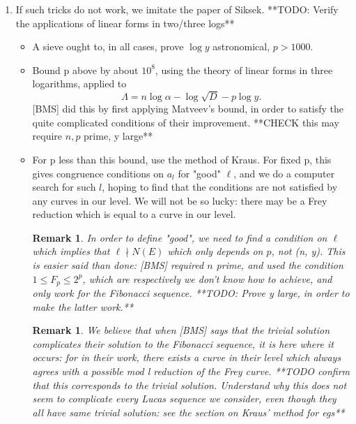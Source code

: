 \documentclass[12pt]{article}
\newtheorem{rem}[thm]{Remark}
\begin{document}
\begin{enumerate}
	\begin{rem}
	If we descend to a curve (or abelian variety) with complex multiplication, we can likely find an immediate contradiction. However, this is of little use to us, as we are often in square-free levels, i.e. semistable elliptic curves, which cannot be CM, since CM implies potentially good. To tell if your abelian varieties have complex multiplication, the only method we know of is to construct enough distinct Hecke characters of the specified conductor. This appears to work only if all abelian varieties at the level had complex multiplication. **QUESTION Can we detect CM abelian varieties?**
	\end{rem}

\item If such tricks do not work, we imitate the paper of Siksek. 
**TODO: Verify the applications of linear forms in two/three logs**
\begin{itemize}
	\item A sieve ought to, in all cases, prove $\log y$ astronomical, $p > 1000$.
	\item Bound p above by about $10^8$, using the theory of linear forms in three logarithms, applied to 
	\[\Lambda = n \log \alpha - \log \sqrt{D} - p \log{y}. \]
	[BMS] did this by first applying Matveev's bound, in order to satisfy the quite complicated conditions of their improvement.
	 **CHECK this may require $n, p$ prime, y large**
	\item For p less than this bound, use the method of Kraus. For fixed p, this gives congruence conditions on $a_l$ for "good" $\ell$, and we do a computer search for such $l$, hoping to find that the conditions are not satisfied by any curves in our level. We will not be so lucky: there may be a Frey reduction which is equal to a curve in our level.
	\begin{rem}	
	 In order to define "good", we need to find a condition on $\ell$ which implies that $\ell \nmid N(E)$ which only depends on $p$, not (n, y). This is easier said than done: [BMS] required $n$ prime, and used the condition $1 \le F_p \le 2^p$, which are respectively we don't know how to achieve, and only work for the Fibonacci sequence. **TODO: Prove y large, in order to make the latter work.**
\end{rem}
\begin{rem}
	We believe that when [BMS] says that the trivial solution complicates their solution to the Fibonacci sequence, it is here where it occurs: for in their work, there exists a curve in their level which always agrees with a possible mod l reduction of the Frey curve. 
**TODO confirm that this corresponds to the trivial solution. Understand why this does not seem to complicate every Lucas sequence we consider, even though they all have same trivial solution: see the section on Kraus' method for egs**
\end{rem}


\end{itemize}
\end{enumerate}
\end{document}
